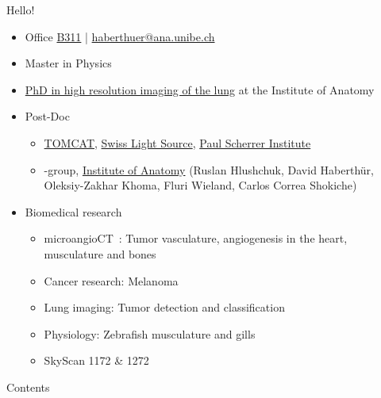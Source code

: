 \begin{frame}{Hello!}
	\begin{itemize}
		\item Office \href{http://osm.org/go/0CZwlGp3A?m}{B311} | \href{mailto:haberthuer@ana.unibe.ch?subject=Feedback\%20from\%20the\%20(micro)-tomography\%20lecture}{haberthuer@ana.unibe.ch}
		\item Master in Physics
		\item \href{https://boris.unibe.ch/2619/}{PhD in high resolution imaging of the lung} at the Institute of Anatomy
		\item Post-Doc
		\begin{itemize}
			\item \href{https://www.psi.ch/sls/tomcat/}{TOMCAT}, \href{https://www.psi.ch/sls/}{Swiss Light Source}, \href{https://www.psi.ch/}{Paul Scherrer Institute}
			\item \uct-group, \href{https://ana.unibe.ch}{Institute of Anatomy} (Ruslan Hlushchuk, David Haberthür, Oleksiy-Zakhar Khoma, Fluri Wieland, Carlos Correa Shokiche)
		\end{itemize}
		\item Biomedical research
		\begin{itemize}
			\item microangioCT~\cite{Hlushchuk2018}: Tumor vasculature, angiogenesis in the heart, musculature and bones
			\item Cancer research: Melanoma
			\item Lung imaging: Tumor detection and classification
			\item Physiology: Zebrafish musculature and gills~\cite{Messerli2019}
			\item SkyScan 1172 \& 1272
		\end{itemize}
	\end{itemize}
\end{frame}

\begin{frame}{Contents}
	\tableofcontents
\end{frame}

